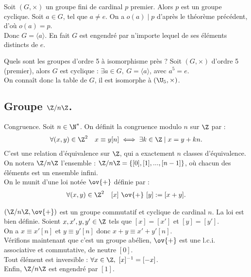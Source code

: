 \documentclass[11pt]{article}
\begin{document}
\vspace*{-0.8cm}

\begin{ex}{}{}
    Soit $(G,\times)$ un groupe fini de cardinal $p$ premier. Alors $p$ est un groupe cyclique.
    \tcblower
    Soit $a\in G$, tel que $a\neq e$. On a $o(a)\mid p$ d'après le théorème précédent, d'où $o(a)=p$.\\
    Donc $G=\langle a \rangle$. En fait $G$ est engendré par n'importe lequel de ses éléments distincts de $e$.
\end{ex}

\vspace*{-0.8cm}

\begin{ex}{}{}
    Quels sont les groupes d'ordre 5 à isomorphisme près ?
    \tcblower
    Soit $(G,\times)$ d'ordre 5 (premier), alors $G$ est cyclique : $\exists a \in G, ~ G=\langle a \rangle$, avec $a^5=e$.\\
    On connaît donc la table de $G$, il est isomorphe à $(\U_5,\times)$.
\end{ex}

\vspace*{-0.8cm}

\subsection{Groupe \texorpdfstring{$\Z/n\Z$}{Lg}.}

\begin{defi}{Congruence.}{}
    Soit $n\in\N^*$. On définit la congruence modulo $n$ sur $\Z$ par :
    \begin{equation*}
        \forall (x,y)\in\Z^2 \quad x \equiv y[n] \iff \exists k \in \Z \mid x=y+kn.
    \end{equation*}
    C'est une relation d'équivalence sur $\Z$, qui a exactement $n$ classes d'équivalence.\\
    On notera $\Z/n\Z$ l'ensemble : $\Z/n\Z=\{[0],[1],...,[n-1]\}$, où chacun des éléments est un ensemble infini.\\
    On le munit d'une loi notée $\ov{+}$ définie par :
    \begin{equation*}
        \forall (x,y) \in \Z^2 \quad [x]~\ov{+}~[y]:=[x+y].
    \end{equation*}
\end{defi}

\vspace*{0.2cm}

\begin{prop}{}{}
    $(\Z/n\Z,\ov{+})$ est un groupe commutatif et cyclique de cardinal $n$.
    \tcblower
    La loi est bien définie. Soient $x,x',y,y'\in\Z$ tels que $[x]=[x']$ et $[y]=[y']$.\\
    On a $x\equiv x'[n]$ et $y\equiv y'[n]$ donc $x+y\equiv x'+y'[n]$.\\
    Vérifions maintenant que c'est un groupe abélien, $\ov{+}$ est une l.c.i. associative et commutative, de neutre $[0]$.\\
    Tout élément est inversible : $\forall x \in \Z, ~ [x]^{-1}=[-x]$.\\
    Enfin, $\Z/n\Z$ est engendré par $[1]$.
\end{prop}
\end{document}
